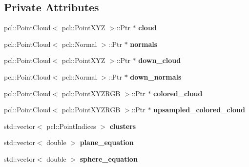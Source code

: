 \subsection*{Private Attributes}
\begin{DoxyCompactItemize}
\item 
\hypertarget{class_plane_a0b493693b28fb0cc74549fa24ded3721}{}\label{class_plane_a0b493693b28fb0cc74549fa24ded3721} 
pcl\+::\+Point\+Cloud$<$ pcl\+::\+Point\+X\+YZ $>$\+::Ptr $\ast$ {\bfseries cloud}
\item 
\hypertarget{class_plane_a28e30d6c24eaa6c4e1d57ea8c1a2d924}{}\label{class_plane_a28e30d6c24eaa6c4e1d57ea8c1a2d924} 
pcl\+::\+Point\+Cloud$<$ pcl\+::\+Normal $>$\+::Ptr $\ast$ {\bfseries normals}
\item 
\hypertarget{class_plane_ae4198f097fe1b58f10068f7bc0962c8c}{}\label{class_plane_ae4198f097fe1b58f10068f7bc0962c8c} 
pcl\+::\+Point\+Cloud$<$ pcl\+::\+Point\+X\+YZ $>$\+::Ptr $\ast$ {\bfseries down\+\_\+cloud}
\item 
\hypertarget{class_plane_aa76fc2b11042a6681c4573159d4fb384}{}\label{class_plane_aa76fc2b11042a6681c4573159d4fb384} 
pcl\+::\+Point\+Cloud$<$ pcl\+::\+Normal $>$\+::Ptr $\ast$ {\bfseries down\+\_\+normals}
\item 
\hypertarget{class_plane_a43513b679c313917824fce91b50f8d32}{}\label{class_plane_a43513b679c313917824fce91b50f8d32} 
pcl\+::\+Point\+Cloud$<$ pcl\+::\+Point\+X\+Y\+Z\+R\+GB $>$\+::Ptr $\ast$ {\bfseries colored\+\_\+cloud}
\item 
\hypertarget{class_plane_a65a1a3e2e6eededc01baaa24b7bc7c6c}{}\label{class_plane_a65a1a3e2e6eededc01baaa24b7bc7c6c} 
pcl\+::\+Point\+Cloud$<$ pcl\+::\+Point\+X\+Y\+Z\+R\+GB $>$\+::Ptr $\ast$ {\bfseries upsampled\+\_\+colored\+\_\+cloud}
\item 
\hypertarget{class_plane_abd24055f6ac0b57fc3f36462f50175d8}{}\label{class_plane_abd24055f6ac0b57fc3f36462f50175d8} 
std\+::vector$<$ pcl\+::\+Point\+Indices $>$ {\bfseries clusters}
\item 
\hypertarget{class_plane_afdf256b7ed2934c1dca9a09beb8c483e}{}\label{class_plane_afdf256b7ed2934c1dca9a09beb8c483e} 
std\+::vector$<$ double $>$ {\bfseries plane\+\_\+equation}
\item 
\hypertarget{class_plane_aa8d9403da437be0c087354a8c891afcd}{}\label{class_plane_aa8d9403da437be0c087354a8c891afcd} 
std\+::vector$<$ double $>$ {\bfseries sphere\+\_\+equation}
\item 
\hypertarget{class_plane_a5efd74ec0c24a0cac7778705d6134452}{}\label{class_plane_a5efd74ec0c24a0cac7778705d6134452} 

\end{DoxyCompactItemize}
